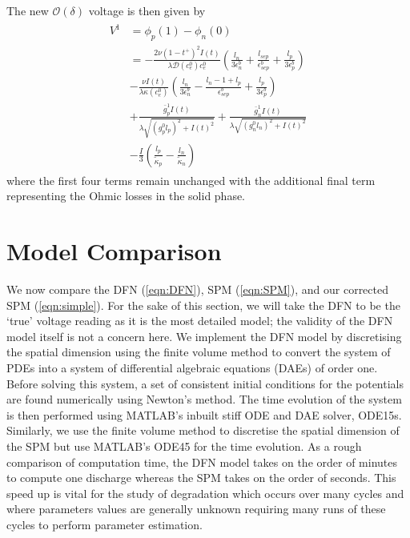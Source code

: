 \documentclass[preprint]{elsarticle}
\begin{document}
The new $\mathcal{O}(\delta)$ voltage is then given by
\begin{align}
 \begin{split} 
V^1 &= \phi_p(1) - \phi_n(0) \\ 
	&=-\frac{2 \nu (1-t^+)^2I(t)}{\lambda \mathcal{D}(c_e^0)c_e^0}\left( \frac{l_n}{3 \epsilon_n^b} + \frac{l_{sep}}{\epsilon_{sep}^b} + \frac{l_p}{3\epsilon_p^b} \right) \\ 
    & - \frac{\nu I(t)}{\lambda \kappa(c_e^0)} \left(\frac{l_n}{3\epsilon_n^b} - \frac{l_n - 1 + l_p}{\epsilon_{sep}^b} + \frac{l_p}{3\epsilon_p^b} \right) \\
    &+ \frac{\bar{g}_p^1 I(t) }{\lambda \sqrt{(g_p^0l_p)^2+I(t)^2}} + \frac{\bar{g}_n^1 I(t) }{\lambda \sqrt{(g_n^0l_n)^2+I(t)^2}} \\ 
    & - \frac{I}{3}\left(\frac{l_p}{\tilde{\kappa}_p}-\frac{l_n}{\tilde{\kappa}_n}\right) 
\end{split}
\end{align} 
where the first four terms remain unchanged with the additional final term representing the Ohmic losses in the solid phase. 

\section{Model Comparison}
We now compare the DFN (\ref{eqn:DFN}), SPM (\ref{eqn:SPM}), and our corrected SPM (\ref{eqn:simple}). For the sake of this section, we will take the DFN to be the `true' voltage reading as it is the most detailed model; the validity of the DFN model itself is not a concern here. We implement the DFN model by discretising the spatial dimension using the finite volume method to convert the system of PDEs into a system of differential algebraic equations (DAEs) of order one. Before solving this system, a set of consistent initial conditions for the potentials are found numerically using Newton's method. The time evolution of the system is then performed using MATLAB's inbuilt stiff ODE and DAE solver, ODE15s. Similarly, we use the finite volume method to discretise the spatial dimension of the SPM but use MATLAB's ODE45 for the time evolution. As a rough comparison of computation time, the DFN model takes on the order of minutes to compute one discharge whereas the SPM takes on the order of seconds. This speed up is vital for the study of degradation which occurs over many cycles and where parameters values are generally unknown requiring many runs of these cycles to perform parameter estimation. \\ 
\end{document}
